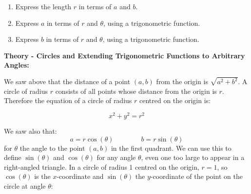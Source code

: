 \documentclass{article}
\begin{document}
\begin{enumerate}
\item Express the length $r$ in terms of $a$ and $b$.
\item Express $a$ in terms of $r$ and $\theta$, using a trigonometric function.
\item Express $b$ in terms of $r$ and $\theta$, using a trigonometric function.
\end{enumerate}

\clearpage


{\bf Theory - Circles and Extending Trigonometric Functions to Arbitrary Angles:}

\vspace{5mm}

We saw above that the distance of a point $(a,b)$ from the origin is $\sqrt{a^2+b^2}$. A circle of radius $r$ consists of all points whose distance from the origin is $r$. Therefore the equation of a circle of radius $r$ centred on the origin is:

\[x^2+y^2=r^2\]

We saw also that:
\[a=r\cos(\theta)\qquad\qquad b=r\sin(\theta)\]
for $\theta$ the angle to the point $(a,b)$ in the first quadrant. We can use this to define $\sin(\theta)$ and $\cos(\theta)$ for any angle $\theta$, even one too large to appear in a right-angled triangle. In a circle of radius 1 centred on the origin, $r=1$, so $\cos(\theta)$ is the $x$-coordinate and $\sin(\theta)$ the $y$-coordinate of the point on the circle at angle $\theta$:

\begin{center}
\end{center}
\end{document}
